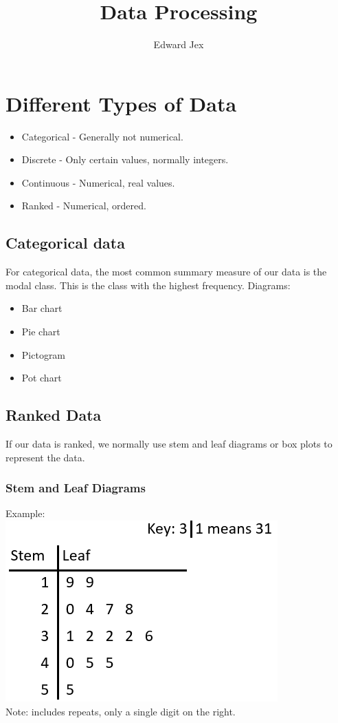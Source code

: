 \documentclass[a4paper,12pt]{article}
\begin{document}
\title{Data Processing}	
\author{Edward Jex}
\maketitle
\section*{Different Types of Data}
\begin{itemize}
	\item Categorical - Generally not numerical.
	\item Discrete - Only certain values, normally integers. 
	\item Continuous - Numerical, real values.
	\item Ranked - Numerical, ordered.
\end{itemize}

\subsection*{Categorical data}
For categorical data, the most common summary measure of our data is the modal class. This is the class with the highest frequency. 
Diagrams:
\begin{itemize}
	\item Bar chart 
	\item Pie chart
	\item Pictogram 
	\item Pot chart 
\end{itemize} 

\subsection*{Ranked Data}
If our data is ranked, we normally use stem and leaf diagrams or box plots to represent the data. 

\subsubsection*{Stem and Leaf Diagrams} 
Example:\\
\includegraphics[scale=0.7]{StemAndLeafDiagram}\\
Note: includes repeats, only a single digit on the right.\\\\
\end{document}
